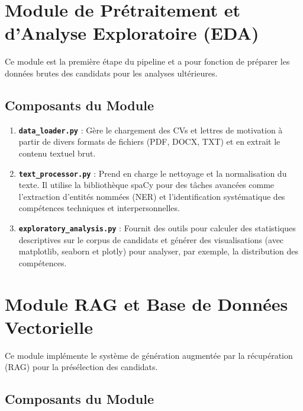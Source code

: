 \documentclass{rapportECL}
\begin{document}
\section{Module de Prétraitement et d'Analyse Exploratoire (EDA)}

Ce module est la première étape du pipeline et a pour fonction de préparer les données brutes des candidats pour les analyses ultérieures.

\subsection{Composants du Module}

\begin{enumerate}[leftmargin=*]
    \item \textbf{\texttt{data\_loader.py}} : Gère le chargement des CVs et lettres de motivation à partir de divers formats de fichiers (PDF, DOCX, TXT) et en extrait le contenu textuel brut.
    
    \item \textbf{\texttt{text\_processor.py}} : Prend en charge le nettoyage et la normalisation du texte. Il utilise la bibliothèque spaCy pour des tâches avancées comme l'extraction d'entités nommées (NER) et l'identification systématique des compétences techniques et interpersonnelles.
    
    \item \textbf{\texttt{exploratory\_analysis.py}} : Fournit des outils pour calculer des statistiques descriptives sur le corpus de candidats et générer des visualisations (avec matplotlib, seaborn et plotly) pour analyser, par exemple, la distribution des compétences.
\end{enumerate}

\section{Module RAG et Base de Données Vectorielle}

Ce module implémente le système de génération augmentée par la récupération (RAG) pour la présélection des candidats.

\subsection{Composants du Module}
\end{document}
